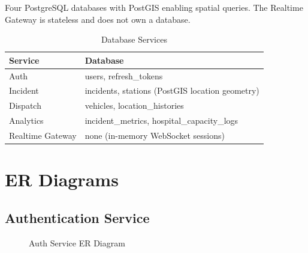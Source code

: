 \documentclass[12pt,a4paper]{report}
\begin{document}
Four PostgreSQL databases with PostGIS enabling spatial queries. The Realtime Gateway is stateless and does not own a database.

\begin{table}[H]
\centering\small
\caption{Database Services}
\begin{tabular}{|l|l|}
\hline
\textbf{Service} & \textbf{Database} \\
\hline
Auth & users, refresh\_tokens \\
\hline
Incident & incidents, stations (PostGIS location geometry) \\
\hline
Dispatch & vehicles, location\_histories \\
\hline
Analytics & incident\_metrics, hospital\_capacity\_logs \\
\hline
Realtime Gateway & none (in-memory WebSocket sessions) \\
\hline
\end{tabular}
\end{table}

\section{ER Diagrams}

\subsection{Authentication Service}
\begin{figure}[H]
\centering
{}
\caption{Auth Service ER Diagram}
\end{figure}
\end{document}
